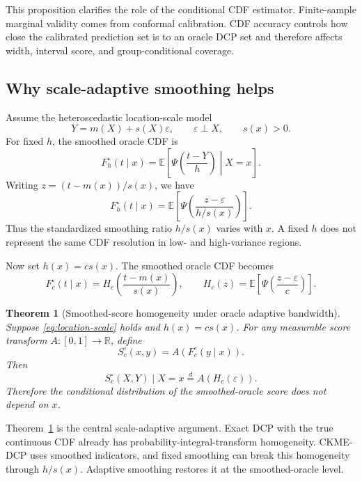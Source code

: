 \documentclass[11pt]{article}
\newtheorem{theorem}{Theorem}
\newcommand{\E}{\mathbb E}
\newcommand{\R}{\mathbb R}
\begin{document}
This proposition clarifies the role of the conditional CDF estimator. Finite-sample marginal validity comes from conformal calibration. CDF accuracy controls how close the calibrated prediction set is to an oracle DCP set and therefore affects width, interval score, and group-conditional coverage.

\subsection{Why scale-adaptive smoothing helps}

Assume the heteroscedastic location-scale model
\begin{equation}
  Y=m(X)+s(X)\varepsilon,\qquad \varepsilon\perp X,\qquad s(x)>0.
  \label{eq:location-scale}
\end{equation}
For fixed \(h\), the smoothed oracle CDF is
\[
  F_h^\circ(t\mid x)=
  \E\left[
  \Psi\!\left(\frac{t-Y}{h}\right)\middle|X=x
  \right].
\]
Writing \(z=(t-m(x))/s(x)\), we have
\begin{equation}
  F_h^\circ(t\mid x)=
  \E\left[
  \Psi\!\left(\frac{z-\varepsilon}{h/s(x)}\right)
  \right].
  \label{eq:fixed-distortion}
\end{equation}
Thus the standardized smoothing ratio \(h/s(x)\) varies with \(x\). A fixed \(h\) does not represent the same CDF resolution in low- and high-variance regions.

Now set \(h(x)=c s(x)\). The smoothed oracle CDF becomes
\begin{equation}
  F_c^\circ(t\mid x)=
  H_c\!\left(\frac{t-m(x)}{s(x)}\right),
  \qquad
  H_c(z)=\E\left[\Psi\!\left(\frac{z-\varepsilon}{c}\right)\right].
  \label{eq:adaptive-representation}
\end{equation}

\begin{theorem}[Smoothed-score homogeneity under oracle adaptive bandwidth]
\label{thm:homogeneity}
Suppose \eqref{eq:location-scale} holds and \(h(x)=c s(x)\). For any measurable score transform \(A:[0,1]\to\R\), define
\[
  S_c^\circ(x,y)=A(F_c^\circ(y\mid x)).
\]
Then
\[
  S_c^\circ(X,Y)\mid X=x
  \overset{d}{=}
  A(H_c(\varepsilon)).
\]
Therefore the conditional distribution of the smoothed-oracle score does not depend on \(x\).
\end{theorem}

Theorem~\ref{thm:homogeneity} is the central scale-adaptive argument. Exact DCP with the true continuous CDF already has probability-integral-transform homogeneity. CKME-DCP uses smoothed indicators, and fixed smoothing can break this homogeneity through \(h/s(x)\). Adaptive smoothing restores it at the smoothed-oracle level.
\end{document}
